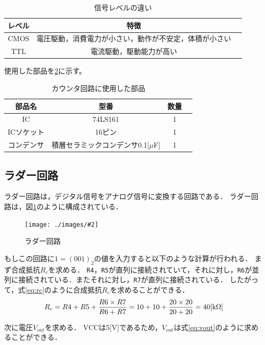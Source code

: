 \documentclass[a4paper,11pt,dvipdfmx]{jsarticle}
\newcommand{\Figure}[4]{
\begin{figure}[H]
\centering
\texttt{[image: ./images/\#2]}
\caption{#3}
\label{fig:#4}
\end{figure}
}
\begin{document}
\begin{table}[H]
  \centering
  \caption{信号レベルの違い}
  \begin{tabular}{|c|c|c|}
    \hline
    レベル & 特徴  \\
    \hline
    CMOS & 電圧駆動，消費電力が小さい，動作が不安定，体積が小さい  \\
    TTL & 電流駆動，駆動能力が高い  \\
    \hline
  \end{tabular}
  \label{tab:level}
\end{table}

使用した部品を\ref{tab:counterparts}に示す。
\begin{table}[H]
  \centering
  \caption{カウンタ回路に使用した部品}
  \begin{tabular}{|c|c|c|c|}
    \hline
    部品名 & 型番 & 数量  \\
    \hline
    IC & 74LS161 & 1  \\
    ICソケット & 16ピン & 1  \\
    コンデンサ & 積層セラミックコンデンサ0.1[\rm{$\mu$}F] & 1  \\
    \hline
  \end{tabular}
  \label{tab:counterparts}
\end{table}


\subsection{ラダー回路}

ラダー回路は，デジタル信号をアナログ信号に変換する回路である．
ラダー回路は，図\ref{fig:ladder}のように構成されている．

\Figure{0.5}{ladder.png}{ラダー回路}{ladder}

もしこの回路に$1 = (001)_2$の値を入力すると以下のような計算が行われる．
まず合成抵抗$R_c$を求める．
\texttt{R4}，\texttt{R5}が直列に接続されていて，それに対し，\texttt{R6}が並列に接続されている．またそれに対し，\texttt{R7}が直列に接続されている．
したがって，式\eqref{eq:rc}のように合成抵抗$R_c$を求めることができる．
\begin{equation}
  R_c = R4 + R5 + \frac{R6 \times R7}{R6 + R7} = 10 + 10 + \frac{20 \times 20}{20 + 20} = 40[\rm{k\Omega}]
  \label{eq:rc}
\end{equation}

次に電圧$V_{\text{out}}$を求める．
VCCは5[V]であるため，$V_{\text{out}}$は式\eqref{eq:vout}のように求めることができる．
\end{document}
